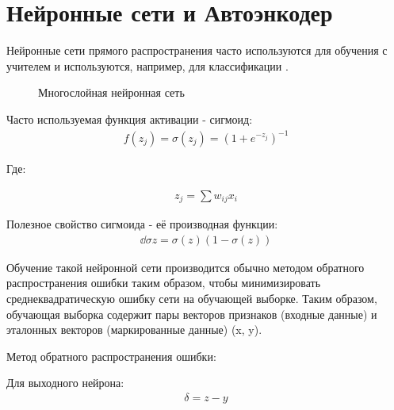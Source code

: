 \documentclass[12pt]{article}
\begin{document}
\section{Нейронные сети и Автоэнкодер}

Нейронные сети прямого распространения часто используются для обучения с учителем и используются, например, для классификации \cite{Stanford1}.

  \begin{figure}[H]
    \noindent{}
    \caption{Многослойная нейронная сеть}
    \label{figCurves}
  \end{figure}

Часто используемая функция активации - сигмоид:
  \begin{align}
	f(z_j)=\sigma(z_j)=(1+e^{-z_j})^{-1}
  \end{align}

Где:

  \begin{align}
	z_j=\sum{{w_{ij}}{x_i}}
  \end{align}

Полезное свойство сигмоида - её производная функции:
  \begin{align}
	\dd{\sigma}z=\sigma(z)(1-\sigma(z))
  \end{align}

Обучение такой нейронной сети производится обычно методом обратного распространения ошибки таким образом, чтобы минимизировать среднеквадратическую ошибку сети на обучающей выборке. Таким образом, обучающая выборка содержит пары векторов признаков (входные данные) и эталонных векторов (маркированные данные) {(x, y)}.

Метод обратного распространения ошибки:

Для выходного нейрона:
  \begin{align}
	\delta=z-y
  \end{align}
\end{document}
